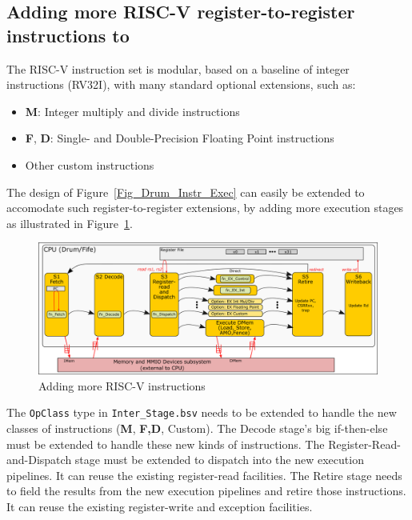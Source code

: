 
\subsection{Adding more RISC-V register-to-register instructions to {\DRUM}}


The RISC-V instruction set is modular, based on a baseline of integer
instructions (RV32I), with many standard optional extensions, such as:

\begin{itemize}
 \item {\bf M}: Integer multiply and divide instructions
 \item {\bf F}, {\bf D}: Single- and Double-Precision Floating Point instructions
 \item Other custom instructions
\end{itemize}

The {\DRUM} design of Figure~\ref{Fig_Drum_Instr_Exec} can easily be
extended to accomodate such register-to-register extensions, by adding
more execution stages as illustrated in
Figure~\ref{Fig_Additional_RISCV_Instructions}.
\begin{figure}[htbp]
  \centerline{\includegraphics[width=6in,angle=0]{Figures/RSN_2025-09-01.000.00_FifeDrum_Stages_Multilayer_L1_L4}}
  \caption{\label{Fig_Additional_RISCV_Instructions}
           Adding more RISC-V instructions}
\end{figure}

The {\tt OpClass} type in {\tt Inter\_Stage.bsv} needs to be extended
to handle the new classes of instructions ({\bf M}, {\bf F,D},
Custom).  The Decode stage's big if-then-else must be extended to
handle these new kinds of instructions.  The
Register-Read-and-Dispatch stage must be extended to dispatch into the
new execution pipelines.  It can reuse the existing register-read
facilities.  The Retire stage needs to field the results from the new
execution pipelines and retire those instructions.  It can reuse the
existing register-write and exception facilities.


